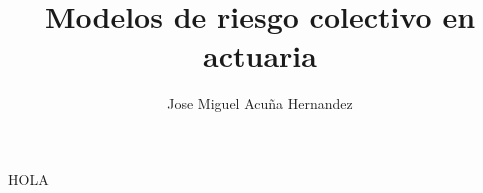\documentclass{article}
\author{Jose Miguel Acuña Hernandez}
\title{Modelos de riesgo colectivo en actuaria}
\begin{document}
\thispagestyle{firstpage}
\vspace*{8\baselineskip}
\graphicspath{ {./figures/} }

\renewcommand{\contentsname}{}
\begin{cuadrocontenido}
  \tableofcontents
\end{cuadrocontenido}

HOLA
\end{document}
